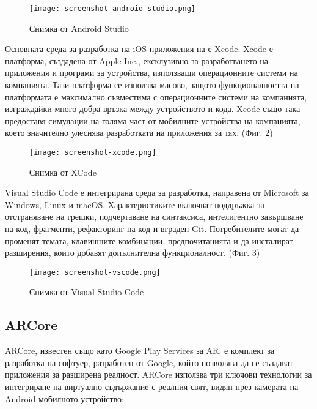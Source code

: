 \begin{figure}[H]
    \texttt{[image: screenshot-android-studio.png]}
    \centering
    \caption{Снимка от Android Studio}
    \label{fig:screenshot-android-studio}
\end{figure}

Основната среда за разработка на iOS приложения на е Xcode. Xcode е платформа, създадена от Apple Inc., ексклузивно за разработването на приложения и програми за устройства, използващи операционните системи на компанията. Тази платформа се използва масово, защото функционалността на платформата е максимално съвместима с операционните системи на компанията, изграждайки много добра връзка между устройството и кода. Xcode също така предоставя симулации на голяма част от мобилните устройства на компанията, което значително улеснява разработката на приложения за тях. (Фиг. \ref{fig:screenshot-xcode})

\begin{figure}[H]
    \texttt{[image: screenshot-xcode.png]}
    \centering
    \caption{Снимка от XCode}
    \label{fig:screenshot-xcode}
\end{figure}

Visual Studio Code е интегрирана среда за разработка, направена от Microsoft за Windows, Linux и macOS. Характеристиките включват поддръжка за отстраняване на грешки, подчертаване на синтаксиса, интелигентно завършване на код, фрагменти, рефакторинг на код и вграден Git. Потребителите могат да променят темата, клавишните комбинации, предпочитанията и да инсталират разширения, които добавят допълнителна функционалност. (Фиг. \ref{fig:screenshot-vscode})

\begin{figure}[H]
    \texttt{[image: screenshot-vscode.png]}
    \centering
    \caption{Снимка от Visual Studio Code}
    \label{fig:screenshot-vscode}
\end{figure}

\subsection{ARCore}
ARCore, известен също като Google Play Services за AR, е комплект за разработка на софтуер, разработен от Google, който позволява да се създават приложения за разширена реалност. ARCore използва три ключови технологии за интегриране на виртуално съдържание с реалния свят, видян през камерата на Android мобилното устройство:


